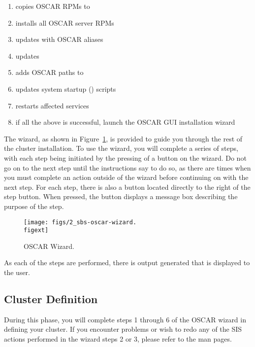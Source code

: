 \begin{enumerate}
\item copies OSCAR RPMs to 
\item installs all OSCAR server RPMs
\item updates  with OSCAR aliases
\item updates  
\item adds OSCAR paths to  
\item updates system startup () scripts
\item restarts affected services
\item if all the above is successful, launch the OSCAR GUI
  installation wizard
\end{enumerate}
  
The wizard, as shown in Figure~\ref{fig:detailed-oscar-wizard}, is
provided to guide you through the rest of the cluster installation.
To use the wizard, you will complete a series of steps, with each step
being initiated by the pressing of a button on the wizard. Do not go
on to the next step until the instructions say to do so, as there are
times when you must complete an action outside of the wizard before
continuing on with the next step. For each step, there is also a
 button located directly to the right of the step button.
When pressed, the  button displays a message box
describing the purpose of the step.

\begin{figure}[htbp]
  \begin{center}
    \texttt{[image: figs/2\_sbs-oscar-wizard.\\figext]}
    \caption{OSCAR Wizard.}
    \label{fig:detailed-oscar-wizard}
  \end{center}
\end{figure}
  
As each of the steps are performed, there is output generated that is
displayed to the user. 


\subsection{Cluster Definition}
\label{sec:detailed-cluster-def}

During this phase, you will complete steps 1 through 6 of the OSCAR
wizard in defining your cluster.  If you encounter problems or wish to
redo any of the SIS actions performed in the wizard steps 2 or 3,
please refer to the  man pages.

